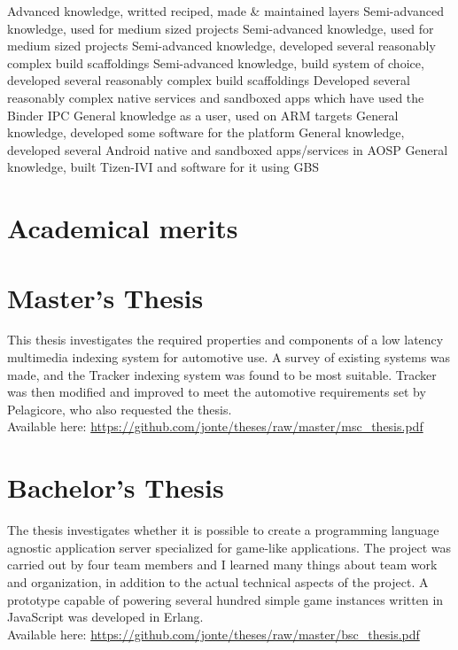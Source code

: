\documentclass{twocolcv}
\begin{document}
 {
     {Advanced knowledge, writted reciped, made \& maintained layers}
     {Semi-advanced knowledge, used for medium sized projects}
     {Semi-advanced knowledge, used for medium sized projects}
     {Semi-advanced knowledge, developed several reasonably complex build scaffoldings}
     {Semi-advanced knowledge, build system of choice, developed several reasonably complex build scaffoldings}
     {Developed several reasonably complex native services and sandboxed apps which have used the Binder IPC}
     {General knowledge as a user, used on ARM targets}
     {General knowledge, developed some software for the platform}
     {General knowledge, developed several Android native and sandboxed apps/services in AOSP}
     {General knowledge, built Tizen-IVI and software for it using GBS}
}

\section*{Academical merits}

\section*{Master's Thesis}
This thesis investigates the required properties and components of a low latency multimedia indexing system for automotive use. A survey of existing systems was made, and the Tracker indexing system was found to be most suitable. Tracker was then modified and improved to meet the automotive requirements set by Pelagicore, who also requested the thesis.
\\
\noindent Available here: \url{https://github.com/jonte/theses/raw/master/msc_thesis.pdf}

\section*{Bachelor's Thesis}
The thesis investigates whether it is possible to create a programming language agnostic application server specialized for game-like applications. The project was carried out by four team members and I learned many things about team work and organization, in addition to the actual technical aspects of the project. A prototype capable of powering several hundred simple game instances written in JavaScript was developed in Erlang.
\\
\noindent Available here: \url{https://github.com/jonte/theses/raw/master/bsc_thesis.pdf}
\end{document}
